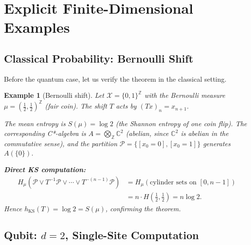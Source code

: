 \documentclass[12pt,a4paper]{article}
\newtheorem{example}[theorem]{Example}
\newcommand{\CC}{\mathbb{C}}
\newcommand{\ZZ}{\mathbb{Z}}
\begin{document}
\section{Explicit Finite-Dimensional Examples}
\label{sec:examples}

\subsection{Classical Probability: Bernoulli Shift}

Before the quantum case, let us verify the theorem in the classical setting.

\begin{example}[Bernoulli shift]\label{ex:bernoulli}
Let $\mathcal{X}=\{0,1\}^\ZZ$ with the Bernoulli measure $\mu=(\frac{1}{2},\frac{1}{2})^\ZZ$
(fair coin).  The shift $T$ acts by $(Tx)_n=x_{n+1}$.

The mean entropy is $S(\mu)=\log 2$ (the Shannon entropy of one coin flip).
The corresponding C*-algebra is $A=\bigotimes_\ZZ\CC^2$ (abelian, since $\CC^2$ is abelian
in the commutative sense), and the partition $\mathcal{P}=\{[x_0=0],[x_0=1]\}$ generates
$A(\{0\})$.

\medskip\noindent\textbf{Direct KS computation:}
\begin{align*}
  H_\mu(\mathcal{P}\vee T^{-1}\mathcal{P}\vee\cdots\vee T^{-(n-1)}\mathcal{P})
  &= H_\mu(\text{cylinder sets on } [0,n-1])\\
  &= n\cdot H(\tfrac{1}{2},\tfrac{1}{2}) = n\log 2.
\end{align*}
Hence $h_{\mathrm{KS}}(T)=\log 2=S(\mu)$, confirming the theorem.
\end{example}

\subsection{Qubit: $d=2$, Single-Site Computation}
\end{document}
